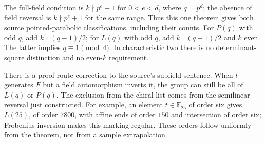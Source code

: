 The full-field condition is $k\nmid p^e-1$ for $0<e<d$, where
$q=p^d$; the absence of field reversal is $k\nmid p^e+1$ for the same
range. Thus this one theorem gives both source pointed-parabolic
classifications, including their counts. For $P(q)$ with odd $q$, add
$k\nmid(q-1)/2$; for $L(q)$ with odd $q$, add $k\mid(q-1)/2$ and
$k$ even. The latter implies $q\equiv1\pmod4$. In characteristic two
there is no determinant-square distinction and no even-$k$ requirement.

There is a proof-route correction to the source's subfield sentence.
When $t$ generates $F$ but a field automorphism inverts it, the group
can still be all of $L(q)$ or $P(q)$. The exclusion from the chiral list
comes from the semilinear reversal just constructed. For example, an
element $t\in\mathbb F_{25}$ of order six gives $L(25)$, of order
$7800$, with affine ends of order $150$ and intersection of order six;
Frobenius inversion makes this marking regular. These orders follow
uniformly from the theorem, not from a sample extrapolation.
